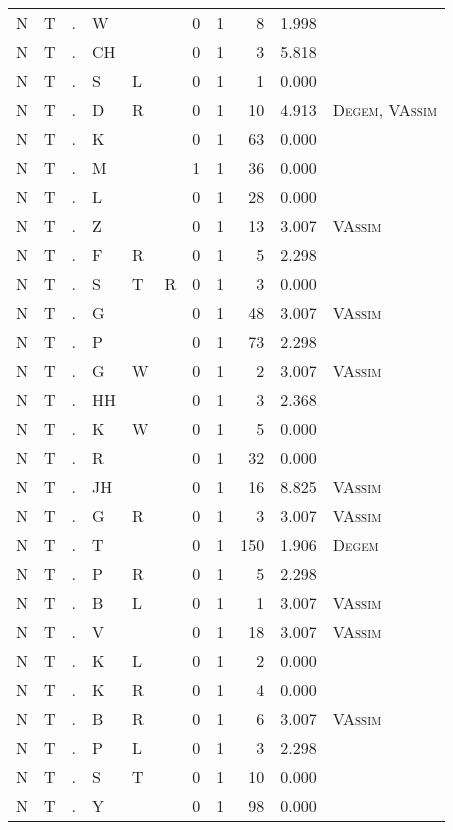 \begin{longtable}{r@{ } r@{ } c@{ } l@{ } l@{ } l@{ } r r r r l }
N & T & . & W &  &  & 0 & 1 & 8 & 1.998 &  \\
N & T & . & CH &  &  & 0 & 1 & 3 & 5.818 &  \\
N & T & . & S & L &  & 0 & 1 & 1 & 0.000 &  \\
N & T & . & D & R &  & 0 & 1 & 10 & 4.913 & \textsc{Degem}, \textsc{VAssim} \\
N & T & . & K &  &  & 0 & 1 & 63 & 0.000 &  \\
N & T & . & M &  &  & 1 & 1 & 36 & 0.000 &  \\
N & T & . & L &  &  & 0 & 1 & 28 & 0.000 &  \\
N & T & . & Z &  &  & 0 & 1 & 13 & 3.007 & \textsc{VAssim} \\
N & T & . & F & R &  & 0 & 1 & 5 & 2.298 &  \\
N & T & . & S & T & R & 0 & 1 & 3 & 0.000 &  \\
N & T & . & G &  &  & 0 & 1 & 48 & 3.007 & \textsc{VAssim} \\
N & T & . & P &  &  & 0 & 1 & 73 & 2.298 &  \\
N & T & . & G & W &  & 0 & 1 & 2 & 3.007 & \textsc{VAssim} \\
N & T & . & HH &  &  & 0 & 1 & 3 & 2.368 &  \\
N & T & . & K & W &  & 0 & 1 & 5 & 0.000 &  \\
N & T & . & R &  &  & 0 & 1 & 32 & 0.000 &  \\
N & T & . & JH &  &  & 0 & 1 & 16 & 8.825 & \textsc{VAssim} \\
N & T & . & G & R &  & 0 & 1 & 3 & 3.007 & \textsc{VAssim} \\
N & T & . & T &  &  & 0 & 1 & 150 & 1.906 & \textsc{Degem} \\
N & T & . & P & R &  & 0 & 1 & 5 & 2.298 &  \\
N & T & . & B & L &  & 0 & 1 & 1 & 3.007 & \textsc{VAssim} \\
N & T & . & V &  &  & 0 & 1 & 18 & 3.007 & \textsc{VAssim} \\
N & T & . & K & L &  & 0 & 1 & 2 & 0.000 &  \\
N & T & . & K & R &  & 0 & 1 & 4 & 0.000 &  \\
N & T & . & B & R &  & 0 & 1 & 6 & 3.007 & \textsc{VAssim} \\
N & T & . & P & L &  & 0 & 1 & 3 & 2.298 &  \\
N & T & . & S & T &  & 0 & 1 & 10 & 0.000 &  \\
N & T & . & Y &  &  & 0 & 1 & 98 & 0.000 &  \\

\end{longtable}

